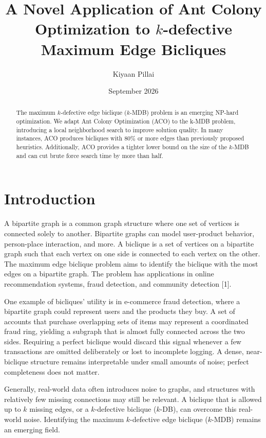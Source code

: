 \documentclass[conference]{IEEEtran}
\title{A Novel Application of Ant Colony Optimization to $k$-defective Maximum Edge Bicliques}
\author{Kiyaan Pillai}
\date{September 2026}
\begin{document}
\maketitle


\begin{abstract}
The maximum $k$-defective edge biclique ($k$-MDB) problem is an emerging NP-hard optimization. We adapt Ant Colony Optimization (ACO) to the k-MDB problem, introducing a local neighborhood search to improve solution quality. In many instances, ACO produces bicliques with $80\%$ or more edges than previously proposed heuristics. Additionally, ACO provides a tighter lower bound on the size of the $k$-MDB and can cut brute force search time by more than half.
\end{abstract}


\section{Introduction}


A bipartite graph is a common graph structure where one set of vertices is connected solely to another. Bipartite graphs can model user-product behavior, person-place interaction, and more. A biclique is a set of vertices on a bipartite graph such that each vertex on one side is connected to each vertex on the other. The maximum edge biclique problem aims to identify the biclique with the most edges on a bipartite graph. The problem has applications in online recommendation systems, fraud detection, and community detection [1].


One example of bicliques' utility is in e-commerce fraud detection, where a bipartite graph could represent users and the products they buy. A set of accounts that purchase overlapping sets of items may represent a coordinated fraud ring, yielding a subgraph that is almost fully connected across the two sides. Requiring a perfect biclique would discard this signal whenever a few transactions are omitted deliberately or lost to incomplete logging. A dense, near-biclique structure remains interpretable under small amounts of noise; perfect completeness does not matter.


Generally, real-world data often introduces noise to graphs, and structures with relatively few missing connections may still be relevant. A biclique that is allowed up to $k$ missing edges, or a $k$-defective biclique ($k$-DB), can overcome this real-world noise. Identifying the maximum $k$-defective edge biclique ($k$-MDB) remains an emerging field.
\end{document}
